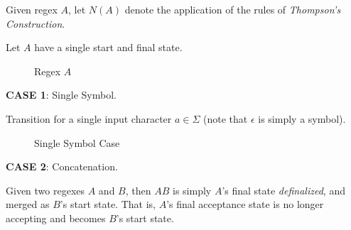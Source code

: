 \begin{definition}
    Given regex $A$, let $N(A)$ denote the application of the rules of \textit{Thompson's Construction}.
    
    Let $A$ have a single start and final state.
    \begin{figure}[H]
        \centering
        \caption{Regex $A$}
        \label{fig:thompson-notation}
    \end{figure}
    
    \textbf{CASE 1}: Single Symbol.
    
    Transition for a single input character $a \in \Sigma$ (note that $\epsilon$ is simply a symbol).
    
    \begin{figure}[H]
        \centering
        \caption{Single Symbol Case}
        \label{fig:thompson-single-symbol}
    \end{figure}
    
    \textbf{CASE 2}: Concatenation.
    
    Given two regexes $A$ and $B$, then $AB$ is simply $A$'s final state \textit{definalized}, and merged as $B$'s start state. That is, $A$'s final acceptance state is no longer accepting and becomes $B$'s start state.
    

\end{definition}
